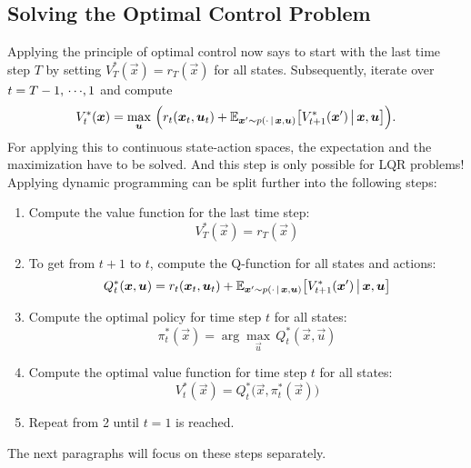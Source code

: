 			\subsection{Solving the Optimal Control Problem}
				Applying the principle of optimal control now says to start with the last time step \(T\) by setting \( V_T^\ast(\vec{x}) = r_T(\vec{x}) \) for all states. Subsequently, iterate over \( t = T - 1,\,\cdots\!,1 \) and compute
				\begin{equation*}
					V_t^\ast(\bm{x}) = \max_{\bm{u}} \, \Big( r_t(\bm{x}_t, \bm{u}_t) + \mathbb{E}_{\bm{x}' \sim p(\cdot \,\vert\, \bm{x}, \bm{u})}\big[ V_{t + 1}^\ast(\bm{x}') \,\big\vert\, \bm{x}, \bm{u} \big] \Big).
				\end{equation*}
				For applying this to continuous state-action spaces, the expectation and the maximization have to be solved. And this step is only possible for LQR problems! Applying dynamic programming can be split further into the following steps:
				\begin{enumerate}
					\item Compute the value function for the last time step:
						\begin{equation*}
							V_T^\ast(\vec{x}) = r_T(\vec{x})
						\end{equation*}
					\item To get from \(t + 1\) to \(t\), compute the Q-function for all states and actions:
						\begin{equation*}
							Q_t^\ast(\bm{x}, \bm{u}) = r_t(\bm{x}_t, \bm{u}_t) + \mathbb{E}_{\bm{x}' \sim p(\cdot \,\vert\, \bm{x}, \bm{u})}\big[ V_{t + 1}^\ast(\bm{x}') \,\big\vert\, \bm{x}, \bm{u} \big]
						\end{equation*}
					\item Compute the optimal policy for time step \(t\) for all states:
						\begin{equation*}
							\pi_t^\ast(\vec{x}) = \arg\max_{\vec{u}} \, Q_t^\ast(\vec{x}, \vec{u})
						\end{equation*}
					\item Compute the optimal value function for time step \(t\) for all states:
						\begin{equation*}
							V_t^\ast(\vec{x}) = Q_t^\ast\big(\vec{x}, \pi_t^\ast(\vec{x})\big)
						\end{equation*}
					\item Repeat from 2 until \( t = 1 \) is reached.
				\end{enumerate}
				The next paragraphs will focus on these steps separately.

